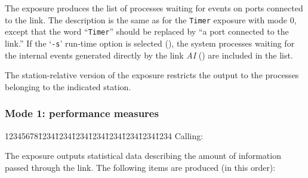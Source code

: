 The exposure produces the
list of processes waiting for events on ports connected to the link.
The description is the same as for the {\tt Timer} exposure
with mode 0, except that the word ``{\tt Timer}'' should be replaced by
``a port connected to the link.''
If the `{\tt -s}' run-time option is selected
(), the system
processes waiting for the internal events generated directly by the link
{\em AI\/} () are included in the list.

The station-relative version of the exposure restricts the output to
the processes belonging to the indicated station.

\subsubsection*{Mode 1: performance measures}

{\tt\begin{tabbing}
12345678\=1234\=1234\=1234\=1234\=1234\=1234\=1234\=1234\kill
{\rm Calling:}
\end{tabbing}}

The exposure outputs statistical data describing the amount of
information passed through the link.
The following items are produced (in this order):

